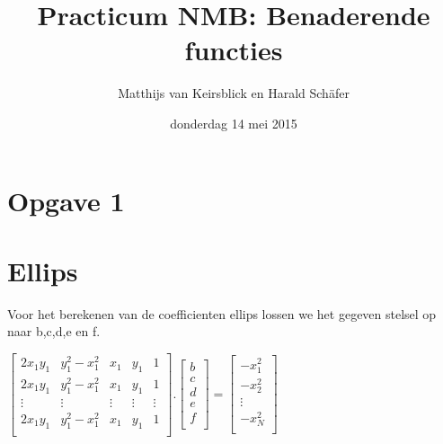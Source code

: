 \documentclass[]{article}
\title{Practicum NMB: Benaderende functies}
\author{Matthijs van Keirsblick en Harald Sch\"{a}fer}
\date{donderdag 14 mei 2015}
\newcommand{\opgave}[1]{\pagebreak\section*{Opgave #1}}
\begin{document}
\maketitle


\opgave{1}
\section*{Ellips}
Voor het berekenen van de coefficienten ellips lossen we het gegeven stelsel op naar b,c,d,e en f.
\\

 \begin{center}
 $
 \begin{bmatrix}
  2x_{1}y_{1} & y_{1}^2-x_{1}^2 & x_{1} & y_{1} & 1 \\
   2x_{1}y_{1} & y_{1}^2-x_{1}^2 & x_{1} & y_{1} & 1 \\
  \vdots  & \vdots  & \vdots & \vdots & \vdots \\
   2x_{1}y_{1} & y_{1}^2-x_{1}^2 & x_{1} & y_{1} & 1 \\
 \end{bmatrix}
 .
  \begin{bmatrix}
  b\\
  c\\
  d\\
  e\\
  f\\
  \end{bmatrix}
  =
   \begin{bmatrix}
    -x^2_1\\
   -x^2_2\\
    \vdots\\
   -x^2_N\\
    \end{bmatrix}
    $
     \end{center}
\end{document}
